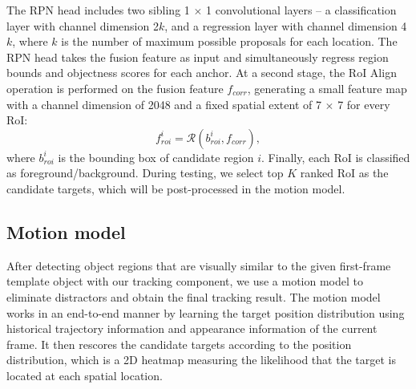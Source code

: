 The RPN head includes two sibling 1 $\times$ 1 convolutional layers -- a classification layer with channel dimension 2$k$, and a regression layer with channel dimension 4$k$, where $k$ is the number of maximum possible proposals for each location. The RPN head takes the fusion feature as input and simultaneously regress region bounds and objectness scores for each anchor.
\fi
At a second stage, the RoI Align operation is performed on the fusion feature $f_{corr}$, generating a small feature map with a channel dimension of 2048 and a fixed spatial extent of 7 $\times$ 7 for every RoI:
\begin{equation}
    f_{roi}^{i} = \mathcal{R}(b_{roi}^{i}, f_{corr}),
\end{equation}
where $b_{roi}^{i}$ is the bounding box of candidate region $i$.
Finally, each RoI is classified as foreground/background. During testing, we select top $K$ ranked RoI as the candidate targets, which will be post-processed in the motion model.

\subsection{Motion model} After detecting object regions that are visually similar to the given first-frame template object with our tracking component, we use a motion model to eliminate distractors and obtain the final tracking result.
The motion model works in an end-to-end manner by learning the target position distribution using historical trajectory information and appearance information of the current frame.
It then rescores the candidate targets according to the position distribution, which is a 2D heatmap measuring the likelihood that the target is located at each spatial location.

